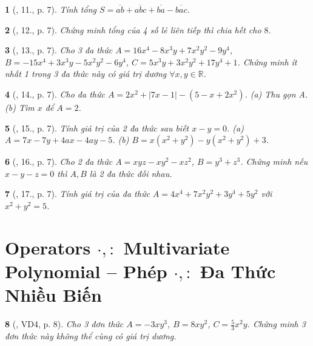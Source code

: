 \documentclass{article}
\newtheorem{baitoan}{}
\begin{document}
\begin{baitoan}[\cite{Tuyen_Toan_8}, 11., p. 7]
	Tính tổng $S = \overline{ab} + \overline{abc} + \overline{ba} -\overline{bac}$.
\end{baitoan}

\begin{baitoan}[\cite{Tuyen_Toan_8}, 12., p. 7]
	Chứng minh tổng của 4 số lẻ liên tiếp thì chia hết cho $8$.
\end{baitoan}

\begin{baitoan}[\cite{Tuyen_Toan_8}, 13., p. 7]
	Cho 3 đa thức $A = 16x^4 - 8x^3y + 7x^2y^2 - 9y^4$, $B = -15x^4 + 3x^3y - 5x^2y^2 - 6y^4$, $C = 5x^3y + 3x^2y^2 + 17y^4 + 1$. Chứng minh ít nhất 1 trong 3 đa thức này có giá trị dương $\forall x,y\in\mathbb{R}$.
\end{baitoan}

\begin{baitoan}[\cite{Tuyen_Toan_8}, 14., p. 7]
	Cho đa thức $A = 2x^2 + |7x - 1| - (5 - x + 2x^2)$. (a) Thu gọn A. (b) Tìm $x$ để $A = 2$.
\end{baitoan}

\begin{baitoan}[\cite{Tuyen_Toan_8}, 15., p. 7]
	Tính giá trị của 2 đa thức sau biết $x - y = 0$. (a) $A = 7x - 7y + 4ax - 4ay - 5$. (b) $B = x(x^2 + y^2) - y(x^2 + y^2) + 3$.
\end{baitoan}

\begin{baitoan}[\cite{Tuyen_Toan_8}, 16., p. 7]
	Cho 2 đa thức $A = xyz - xy^2 - xz^2$, $B = y^3 + z^3$. Chứng minh nếu $x - y - z = 0$ thì $A,B$ là 2 đa thức đối nhau.
\end{baitoan}

\begin{baitoan}[\cite{Tuyen_Toan_8}, 17., p. 7]
	Tính giá trị của đa thức $A = 4x^4 + 7x^2y^2 + 3y^4 + 5y^2$ với $x^2 + y^2 = 5$.
\end{baitoan}


\section{Operators $\cdot,:$ Multivariate Polynomial -- Phép $\cdot,:$ Đa Thức Nhiều Biến}

\begin{baitoan}[\cite{Tuyen_Toan_8}, VD4, p. 8]
	Cho 3 đơn thức $A = -3xy^3$, $B = 8xy^2$, $C = \frac{5}{3}x^2y$. Chứng minh 3 đơn thức này không thể cùng có giá trị dương.
\end{baitoan}
\end{document}
